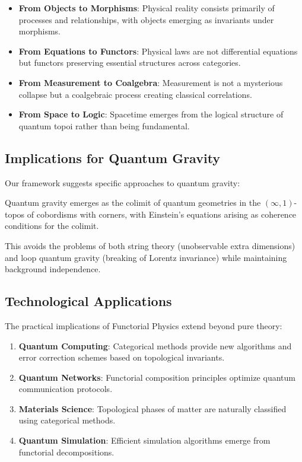 \begin{itemize}[leftmargin=*]
\item \textbf{From Objects to Morphisms}: Physical reality consists primarily of processes and relationships, with objects emerging as invariants under morphisms.

\item \textbf{From Equations to Functors}: Physical laws are not differential equations but functors preserving essential structures across categories.

\item \textbf{From Measurement to Coalgebra}: Measurement is not a mysterious collapse but a coalgebraic process creating classical correlations.

\item \textbf{From Space to Logic}: Spacetime emerges from the logical structure of quantum topoi rather than being fundamental.
\end{itemize}

\subsection{Implications for Quantum Gravity}

Our framework suggests specific approaches to quantum gravity:

\begin{theorem}
Quantum gravity emerges as the colimit of quantum geometries in the $(\infty,1)$-topos of cobordisms with corners, with Einstein's equations arising as coherence conditions for the colimit.
\end{theorem}

This avoids the problems of both string theory (unobservable extra dimensions) and loop quantum gravity (breaking of Lorentz invariance) while maintaining background independence.

\subsection{Technological Applications}

The practical implications of Functorial Physics extend beyond pure theory:

\begin{enumerate}[leftmargin=*]
\item \textbf{Quantum Computing}: Categorical methods provide new algorithms and error correction schemes based on topological invariants.

\item \textbf{Quantum Networks}: Functorial composition principles optimize quantum communication protocols.

\item \textbf{Materials Science}: Topological phases of matter are naturally classified using categorical methods.

\item \textbf{Quantum Simulation}: Efficient simulation algorithms emerge from functorial decompositions.
\end{enumerate}

